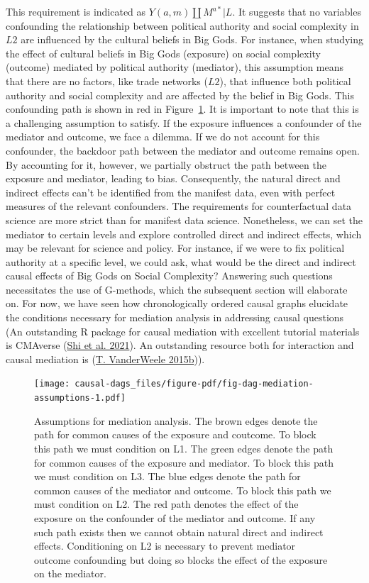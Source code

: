 \documentclass[
  singlecolumn]{report}
\begin{document}
This requirement is indicated as \(Y(a,m) \coprod M^{a*} | L\). It
suggests that no variables confounding the relationship between
political authority and social complexity in \(L2\) are influenced by
the cultural beliefs in Big Gods. For instance, when studying the effect
of cultural beliefs in Big Gods (exposure) on social complexity
(outcome) mediated by political authority (mediator), this assumption
means that there are no factors, like trade networks (\(L2\)), that
influence both political authority and social complexity and are
affected by the belief in Big Gods. This confounding path is shown in
red in Figure~\ref{fig-dag-mediation-assumptions}. It is important to
note that this is a challenging assumption to satisfy. If the exposure
influences a confounder of the mediator and outcome, we face a dilemma.
If we do not account for this confounder, the backdoor path between the
mediator and outcome remains open. By accounting for it, however, we
partially obstruct the path between the exposure and mediator, leading
to bias. Consequently, the natural direct and indirect effects can't be
identified from the manifest data, even with perfect measures of the
relevant confounders. The requirements for counterfactual data science
are more strict than for manifest data science. Nonetheless, we can set
the mediator to certain levels and explore controlled direct and
indirect effects, which may be relevant for science and policy. For
instance, if we were to fix political authority at a specific level, we
could ask, what would be the direct and indirect causal effects of Big
Gods on Social Complexity? Answering such questions necessitates the use
of G-methods, which the subsequent section will elaborate on. For now,
we have seen how chronologically ordered causal graphs elucidate the
conditions necessary for mediation analysis in addressing causal
questions (An outstanding R package for causal mediation with excellent
tutorial materials is CMAverse (\protect\hyperlink{ref-shi2021}{Shi et
al. 2021}). An outstanding resource both for interaction and causal
mediation is (\protect\hyperlink{ref-vanderweele2015a}{T. VanderWeele
2015b})).

\begin{figure}

{\centering \texttt{[image: causal-dags\_files/figure-pdf/fig-dag-mediation-assumptions-1.pdf]}

}

\caption{\label{fig-dag-mediation-assumptions}Assumptions for mediation
analysis. The brown edges denote the path for common causes of the
exposure and coutcome. To block this path we must condition on L1. The
green edges denote the path for common causes of the exposure and
mediator. To block this path we must condition on L3. The blue edges
denote the path for common causes of the mediator and outcome. To block
this path we must condition on L2. The red path denotes the effect of
the exposure on the confounder of the mediator and outcome. If any such
path exists then we cannot obtain natural direct and indirect effects.
Conditioning on L2 is necessary to prevent mediator outcome confounding
but doing so blocks the effect of the exposure on the mediator.}

\end{figure}
\end{document}
